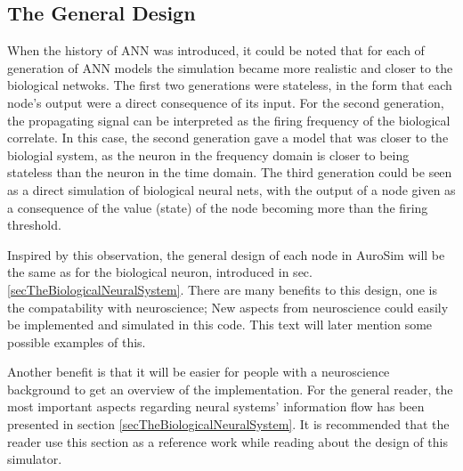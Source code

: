 	\subsection{The General Design}
	\label{ssecTheGeneralDesign}
		When the history of ANN was introduced, it could be noted that for each of generation of ANN models the simulation became more realistic and closer to the biological netwoks.
		The first two generations were stateless, in the form that each node's output were a direct consequence of its input.
		For the second generation, the propagating signal can be interpreted as the firing frequency of the biological correlate.
		In this case, the second generation gave a model that was closer to the biologial system, as the neuron in the frequency domain is closer to being stateless than the neuron in the time domain.
		The third generation could be seen as a direct simulation of biological neural nets, with the output of a node given as a consequence of the value (state) of the node becoming more than the firing threshold.
	
		Inspired by this observation, the general design of each node in AuroSim will be the same as for the biological neuron, introduced in sec. \ref{secTheBiologicalNeuralSystem}.
		There are many benefits to this design, one is the compatability with neuroscience;
			New aspects from neuroscience could easily be implemented and simulated in this code.
		This text will later mention some possible examples of this. %

		Another benefit is that it will be easier for people with a neuroscience background to get an overview of the implementation.
		For the general reader, the most important aspects regarding neural systems' information flow has been presented in section \ref{secTheBiologicalNeuralSystem}. %
		It is recommended that the reader use this section as a reference work while reading about the design of this simulator.

